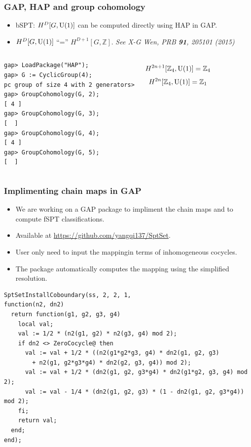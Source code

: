 \documentclass[xcolor=table, aspectratio=169,ignorenonframetext]{beamer}
\newcommand{\uone}{\text U(1)}
\begin{document}
\begin{frame}[fragile]
	\frametitle{GAP, HAP and group cohomology}
	\begin{itemize}
		\item bSPT: $H^D[G,\uone]$ can be computed directly using HAP in GAP.
		\item $H^D[G,\uone]$ ``='' $H^{D+1}[G,\mathbb Z]$. \emph{See X-G Wen, PRB \textbf{91}, 205101 (2015)}
	\end{itemize}
	\begin{columns}
	\begin{lstlisting}[basicstyle=\footnotesize]
gap> LoadPackage("HAP");
gap> G := CyclicGroup(4);
pc group of size 4 with 2 generators>
gap> GroupCohomology(G, 2);
[ 4 ]
gap> GroupCohomology(G, 3);
[  ]
gap> GroupCohomology(G, 4);
[ 4 ]
gap> GroupCohomology(G, 5);
[  ]
\end{lstlisting}
	\[H^{2n+1}[\mathbb Z_4,\uone] = \mathbb Z_4\]
	\[H^{2n}[\mathbb Z_4,\uone] = \mathbb Z_1\]
	\end{columns}
\end{frame}

\begin{frame}[fragile]
	\frametitle{Implimenting chain maps in GAP}
	\begin{itemize}
		\item We are working on a GAP package to impliment the chain maps and to compute fSPT classifications.
		\item Available at \url{https://github.com/yangqi137/SptSet}.
		\item User only need to input the mappingin terms of inhomogeneous cocycles.
		\item The package automatically computes the mapping using the simplified resolution.
	\end{itemize}
\begin{lstlisting}[basicstyle=\footnotesize,morekeywords={function,return,local,if,fi,then,end},showspaces=false,showtabs=false, keywordstyle=\color{blue}]
SptSetInstallCoboundary(ss, 2, 2, 1,
function(n2, dn2)
  return function(g1, g2, g3, g4)
    local val;
    val := 1/2 * (n2(g1, g2) * n2(g3, g4) mod 2);
    if dn2 <> ZeroCocycle@ then
      val := val + 1/2 * ((n2(g1*g2*g3, g4) * dn2(g1, g2, g3)
        + n2(g1, g2*g3*g4) * dn2(g2, g3, g4)) mod 2);
      val := val + 1/2 * (dn2(g1, g2, g3*g4) * dn2(g1*g2, g3, g4) mod 2);
      val := val - 1/4 * (dn2(g1, g2, g3) * (1 - dn2(g1, g2, g3*g4)) mod 2);
    fi;
    return val;
  end;
end);
\end{lstlisting}
\end{frame}
\end{document}
